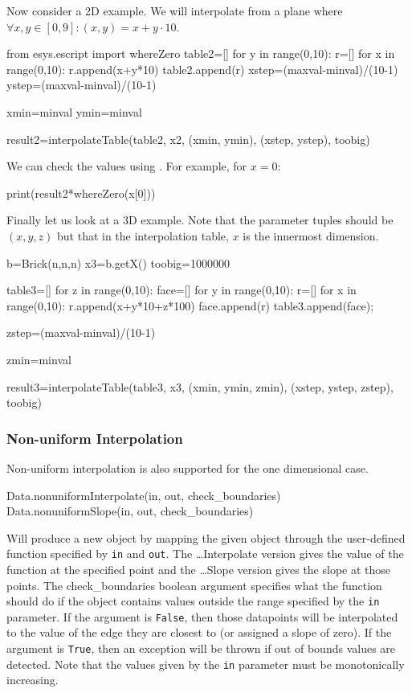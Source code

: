 Now consider a 2D example. We will interpolate from a plane where $\forall x,y\in[0,9]:(x,y)=x+y\cdot10$.

\begin{python}
from esys.escript import whereZero
table2=[]
for y in range(0,10):
      r=[]
      for x in range(0,10):
	 r.append(x+y*10)
      table2.append(r)
xstep=(maxval-minval)/(10-1)
ystep=(maxval-minval)/(10-1)

xmin=minval
ymin=minval

result2=interpolateTable(table2, x2, (xmin, ymin), (xstep, ystep), toobig)
\end{python}

We can check the values using .
For example, for $x=0$:
\begin{python}
print(result2*whereZero(x[0])) 
\end{python}

Finally let us look at a 3D example. Note that the parameter tuples should be
$(x,y,z)$ but that in the interpolation table, $x$ is the innermost dimension.
\begin{python}
b=Brick(n,n,n)
x3=b.getX()
toobig=1000000

table3=[]
for z in range(0,10):
   face=[]
   for y in range(0,10):
      r=[]
      for x in range(0,10):
	 r.append(x+y*10+z*100)
      face.append(r)
   table3.append(face);

zstep=(maxval-minval)/(10-1)

zmin=minval

result3=interpolateTable(table3, x3, (xmin, ymin, zmin), 
    (xstep, ystep, zstep), toobig)
\end{python}


\subsubsection{Non-uniform Interpolation}
Non-uniform interpolation is also supported for the one dimensional case.
\begin{python}
Data.nonuniformInterpolate(in, out, check_boundaries)
Data.nonuniformSlope(in, out, check_boundaries)
\end{python}

Will produce a new \Data object by mapping the given \Data object through the user-defined function
specified by \texttt{in} and \texttt{out}.
The \ldots Interpolate version gives the value of the function at the specified point and the 
\ldots Slope version gives the slope at those points.
The check_boundaries boolean argument specifies what the function should do if the \Data object contains
values outside the range specified by the \texttt{in} parameter.
If the argument is \texttt{False}, then those datapoints will be interpolated to the value of the edge 
they are closest to (or assigned a slope of zero).
If the argument is \texttt{True}, then an exception will be thrown if out of bounds values are detected.
Note that the values given by the \texttt{in} parameter must be monotonically increasing.

